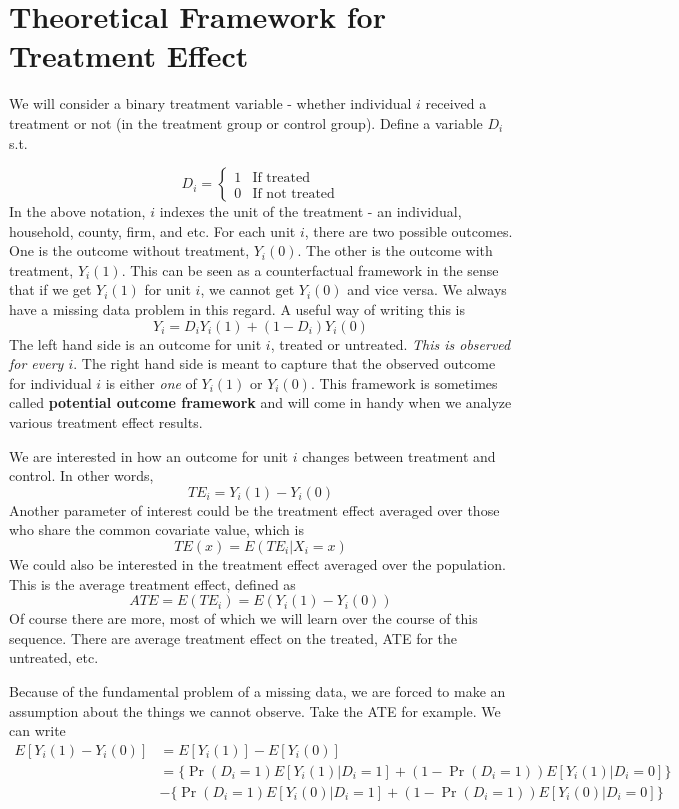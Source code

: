 \section{Theoretical Framework for Treatment Effect}
We will consider a binary treatment variable - whether individual $i$ received a treatment or not (in the treatment group or control group). Define a variable $D_i$ s.t.

\[
D_i = \begin{cases} 1 & \text{If treated} \\ 0 & \text{If not treated}\end{cases}
\]
In the above notation, $i$ indexes the unit of the treatment - an individual, household,  county, firm, and etc. For each unit $i$, there are two possible outcomes. One is the outcome without treatment,  $Y_i(0)$. The other is the outcome with treatment, $Y_i(1)$. This can be seen as a counterfactual framework in the sense that if we get $Y_i(1)$ for unit $i$, we cannot get $Y_i(0)$ and vice versa. We always have a missing data problem in this regard. A useful way of writing this is
\[
Y_i = D_iY_i(1) + (1-D_i)Y_i(0)
\]
The left hand side is an outcome for unit $i$, treated or untreated. \textit{This is observed for every $i$}. The right hand side is meant to capture that the observed outcome for individual $i$ is either \textit{one} of $Y_i(1)$ or $Y_i(0)$. This framework is sometimes called \textbf{potential outcome framework} and will come in handy when we analyze various treatment effect results. \par
We are interested in how an outcome for unit $i$ changes between treatment and control. In other words,
\[
TE_i = Y_i(1)-Y_i(0)
\]
Another parameter of interest could be the treatment effect averaged over those who share the common covariate value, which is
\[
TE(x) = E(TE_i|X_i=x)
\]
We could also be interested in the treatment effect averaged over the population. This is the average treatment effect, defined as
\[
ATE=E(TE_i)=E(Y_i(1)-Y_i(0))
\]
Of course there are more, most of which we will learn over the course of this sequence. There are average treatment effect on the treated, ATE for the untreated, etc. \par
Because of the fundamental  problem of a missing data, we are forced to make an assumption about the things we cannot observe. Take the ATE for example. We can write
\begin{align*}
E[Y_i(1)-Y_i(0)] & = E[Y_i(1)]-E[Y_i(0)]\\
&=\{\Pr(D_i=1)E[Y_i(1)|D_i=1]+(1-\Pr(D_i=1))E[Y_i(1)|D_i=0]\}\\
&-\{\Pr(D_i=1)E[Y_i(0)|D_i=1]+(1-\Pr(D_i=1))E[Y_i(0)|D_i=0]\}
\end{align*}
